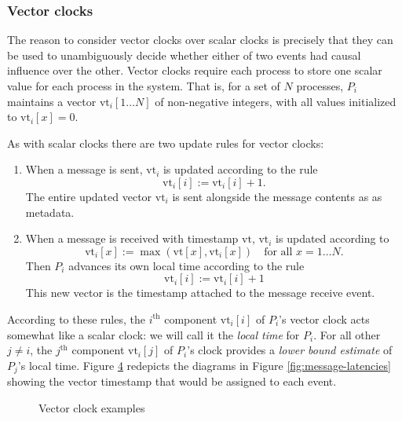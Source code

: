 \documentclass[]             %
{NASA}                       %
\theoremstyle{definition}
\begin{document}
\subsubsection{Vector clocks}
\newcommand{\vt}{\textrm{vt}} The reason to consider vector clocks
over scalar clocks is precisely that they can be used to unambiguously
decide whether either of two events had causal influence over the
other. Vector clocks require each process to store one scalar value
for each process in the system. That is, for a set of $N$ processes,
$P_i$ maintains a vector $\vt_i[1 \ldots N]$ of non-negative integers,
with all values initialized to $\vt_i[x] = 0$.

As with scalar clocks there are two update rules for vector clocks:
\begin{enumerate}
\item When a message is sent, $\vt_i$ is updated according to the rule
  \[\vt_i[i] := \vt_i[i] + 1.\]
  The entire updated vector $\vt_i$ is sent alongside the message
  contents as as metadata.
\item When a message is received with timestamp $\vt$, $\vt_i$ is updated according to
  \[\vt_i[x] := \max(\vt[x], \vt_i[x]) \quad \textrm{for all $x = 1\ldots N$}.\]
  Then $P_i$ advances its own local time according to the rule
  \[ \vt_i[i] := \vt_i[i] + 1\]
  This new vector is the timestamp attached to the message receive event.
\end{enumerate}

According to these rules, the $i^\textrm{th}$ component $\vt_i[i]$ of
$P_i$'s vector clock acts somewhat like a scalar clock: we
will call it the \emph{local time} for $P_i$. For all other
$j \neq i$, the $j^\textrm{th}$ component $\vt_i[j]$ of $P_i$'s clock
provides a \emph{lower bound estimate} of $P_j$'s local time.  Figure
\ref{fig:message-latencies-vector} redepicts the diagrams in Figure
\ref{fig:message-latencies} showing the vector timestamp that would be
assigned to each event.

\begin{figure}[p]
  \setlength\belowcaptionskip{5ex}

  \begin{subfigure}{1\textwidth}
    \centering
    
    \label{fig:message-latencies-vector-a}
  \end{subfigure}

  \vspace{4ex}

  \begin{subfigure}{1\textwidth}
    \centering 
    \label{fig:message-latencies-vector-b}
  \end{subfigure}

  \begin{subfigure}{1\textwidth}
    \centering 
    \label{fig:message-latencies-vector-c}
  \end{subfigure}

  \caption{Vector clock examples}
  \label{fig:message-latencies-vector}
\end{figure}
\end{document}
